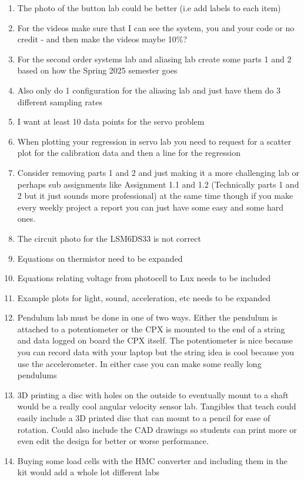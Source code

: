 \begin{enumerate}[itemsep=-5pt]
\item The photo of the button lab could be better (i.e add labels to
  each item)
\item For the videos make sure that I can see the system, you and your code or no credit - and then make the videos maybe 10\%?
\item For the second order systems lab and aliasing lab create some parts 1 and 2 based on how the Spring 2025 semester goes
\item Also only do 1 configuration for the aliasing lab and just have them do 3 different sampling rates
\item I want at least 10 data points for the servo problem
\item When plotting your regression in servo lab you need to request for a scatter plot for the calibration data and then a line for the regression
\item Consider removing parts 1 and 2 and just making it a more challenging lab or perhaps sub assignments like Assignment 1.1 and 1.2 (Technically parts 1 and 2 but it just sounds more professional) at the same time though if you make every weekly project a report you can just have some easy and some hard ones.
\item The circuit photo for the LSM6DS33 is not correct
\item Equations on thermistor need to be expanded
\item Equations relating voltage from photocell to Lux needs to be included
\item Example plots for light, sound, acceleration, etc needs to be expanded
\item Pendulum lab must be done in one of two ways. Either the pendulum is attached to a potentiometer or the CPX is mounted to the end of a string and data logged on board the CPX itself. The potentiometer is nice because you can record data with your laptop but the string idea is cool because you use the accelerometer. In either case you can make some really long pendulums
\item 3D printing a disc with holes on the outside to eventually mount to a shaft would be a really cool angular velocity sensor lab. Tangibles that teach could easily include a 3D printed disc that can mount to a pencil for ease of rotation. Could also include the CAD drawings so students can print more or even edit the design for better or worse performance.
\item Buying some load cells with the HMC converter and including them in the kit would add a whole lot different labs

\end{enumerate}
